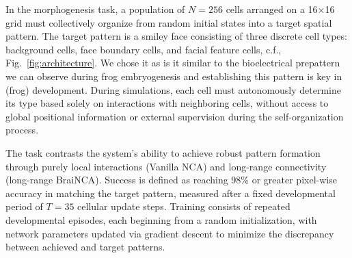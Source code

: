 \documentclass[letterpaper]{article}
\newcommand{\bh}[1]{{\color{black}#1}}  %
\begin{document}
In the morphogenesis task, a population of $N = 256$ cells arranged on a 16×16 grid must collectively organize from random initial states into a target spatial pattern. The target pattern is a smiley face consisting of three discrete cell types: background cells, face boundary cells, and facial feature cells\bh{, c.f., Fig.~\ref{fig:architecture}}. We chose it as is it similar to the bioelectrical prepattern we can observe during frog embryogenesis \cite{vandenberg2011v} and establishing this pattern is key in (frog) development. During simulations, each cell must autonomously determine its type based solely on interactions with neighboring cells, without access to global positional information or external supervision during the self-organization process.

The task 
\bh{contrasts}
the system's ability to achieve robust pattern formation through purely local interactions \bh{(Vanilla NCA) and long-range connectivity (long-range BraiNCA)}. Success is defined as reaching 98\% or greater pixel-wise accuracy in matching the target pattern, measured after a fixed developmental period of \bh{$T=35$}
cellular update steps. Training consists of repeated developmental episodes, each beginning from a random initialization, with network parameters updated via gradient descent to minimize the discrepancy between achieved and target patterns.
\end{document}
